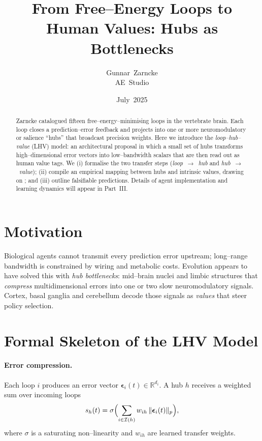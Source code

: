 \documentclass[11pt]{article}
\title{From Free--Energy Loops to Human Values: Hubs as Bottlenecks}
\author{Gunnar~Zarncke\\AE~Studio}
\date{July~2025}
\begin{document}
\maketitle

\begin{abstract}
Zarncke \citeyearpar{zarncke2025stratification} catalogued fifteen free--energy--minimising loops in the vertebrate brain. Each loop closes a prediction--error feedback and projects into one or more neuromodulatory or salience ``hubs'' that broadcast precision weights. Here we introduce the \emph{loop--hub--value} (LHV) model: an architectural proposal in which a small set of hubs transforms high--dimensional error vectors into low--bandwidth scalars that are then read out as human value tags. We (i) formalise the two transfer steps (\emph{loop~$\rightarrow$~hub} and \emph{hub~$\rightarrow$~value}); (ii) compile an empirical mapping between hubs and intrinsic values, drawing on \citet{zarncke2025stratification}; and (iii) outline falsifiable predictions. Details of agent implementation and learning dynamics will appear in Part~III.
\end{abstract}

\section{Motivation}
Biological agents cannot transmit every prediction error upstream; long--range bandwidth is constrained by wiring and metabolic costs. Evolution appears to have solved this with \emph{hub bottlenecks}: mid--brain nuclei and limbic structures that \emph{compress} multidimensional errors into one or two slow neuromodulatory signals. Cortex, basal ganglia and cerebellum decode those signals as \emph{values} that steer policy selection.

\section{Formal Skeleton of the LHV Model}
\paragraph{Error compression.} Each loop $i$ produces an error vector $\boldsymbol{\epsilon}_i(t) \in \mathbb{R}^{d_i}$. A hub $h$ receives a weighted sum over incoming loops
\begin{equation}
 s_h(t)=\sigma\Bigl(\sum_{i\in\mathcal{I}(h)} w_{ih}\,\lVert\boldsymbol{\epsilon}_i(t)\rVert_{p}\Bigr),
\end{equation}
where $\sigma$ is a saturating non--linearity and $w_{ih}$ are learned transfer weights.
\end{document}
